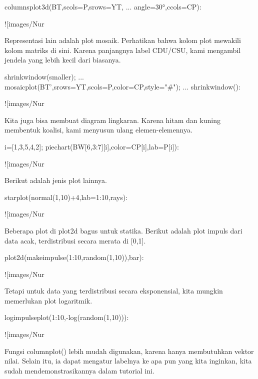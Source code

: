 \documentclass{article}
\begin{document}
\>columnsplot3d(BT,scols=P,srows=YT, ...  
\>     angle=30°,ccols=CP):


![images/Nur%

Representasi lain adalah plot mosaik. Perhatikan bahwa kolom plot
mewakili kolom matriks di sini. Karena panjangnya label CDU/CSU, kami
mengambil jendela yang lebih kecil dari biasanya.


\>shrinkwindow(\>smaller);  ...  
\>   mosaicplot(BT',srows=YT,scols=P,color=CP,style="#"); ...  
\>   shrinkwindow():


![images/Nur%

Kita juga bisa membuat diagram lingkaran. Karena hitam dan kuning
membentuk koalisi, kami menyusun ulang elemen-elemennya.


\>i=[1,3,5,4,2]; piechart(BW[6,3:7][i],color=CP[i],lab=P[i]):


![images/Nur%

Berikut adalah jenis plot lainnya.


\>starplot(normal(1,10)+4,lab=1:10,\>rays):


![images/Nur%

Beberapa plot di plot2d bagus untuk statika. Berikut adalah plot
impuls dari data acak, terdistribusi secara merata di [0,1].


\>plot2d(makeimpulse(1:10,random(1,10)),\>bar):


![images/Nur%

Tetapi untuk data yang terdistribusi secara eksponensial, kita mungkin
memerlukan plot logaritmik.


\>logimpulseplot(1:10,-log(random(1,10))):


![images/Nur%

Fungsi columnplot() lebih mudah digunakan, karena hanya membutuhkan
vektor nilai. Selain itu, ia dapat mengatur labelnya ke apa pun yang
kita inginkan, kita sudah mendemonstrasikannya dalam tutorial ini.
\end{document}
